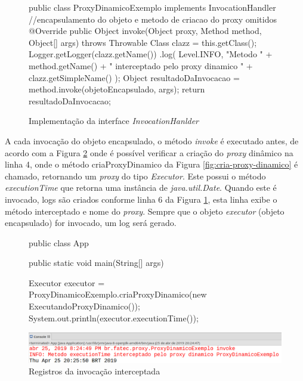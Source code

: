 \begin{figure}[H]
    \centering
    \caption{Implementação da interface \textit{InvocationHanlder}}
\begin{java}
public class ProxyDinamicoExemplo implements InvocationHandler {
//encapsulamento do objeto e metodo de criacao do proxy omitidos
	@Override
	public Object invoke(Object proxy, Method method, Object[] args) throws Throwable {
		Class clazz = this.getClass();
		Logger.getLogger(clazz.getName())
		    .log(
                        Level.INFO, "Metodo " +
                        method.getName() + 
                        " interceptado pelo proxy dinamico " +
                        clazz.getSimpleName()
		    );
		Object resultadoDaInvocacao = method.invoke(objetoEncapsulado, args);
		return resultadoDaInvocacao;
	}
}
\end{java}
    \label{fig:invoke-implementacao}
\end{figure}

\par A cada invocação do objeto encapsulado, o método \textit{invoke} é executado antes, de acordo com a Figura \ref{fig:invoke-registrando-log} onde é possível verificar a criação do \textit{proxy} dinâmico na linha 4, onde o método criaProxyDinamico da Figura \ref{fig:cria-proxy-dinamico} é chamado, retornando um \textit{proxy} do tipo \textit{Executor}. Este possui o método \textit{executionTime} que retorna uma instância de \textit{java.util.Date}. Quando este é invocado, logs são criados conforme linha 6 da Figura \ref{fig:invoke-implementacao}, esta linha exibe o método interceptado e nome do \textit{proxy}. Sempre que o objeto \textit{executor} (objeto encapsulado) for invocado, um log será gerado.

\begin{figure}[H]
    \centering
    \caption{Registros da invocação interceptada}
    \label{fig:invoke-registrando-log}
    \begin{java}
public class App {
	public static void main(String[] args) {
	
		Executor executor = ProxyDinamicoExemplo.criaProxyDinamico(new ExecutandoProxyDinamico());
		System.out.println(executor.executionTime());
	}
}
    \end{java}
    \includegraphics[scale=0.4]{src/imagens/cap2/invoke-registrando-log.png}
\end{figure}

